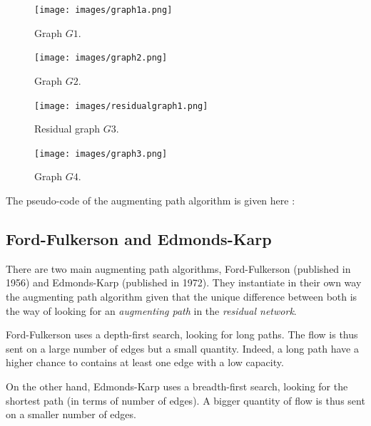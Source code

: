\begin{figure}[h!]
   \begin{minipage}[b]{0.40\linewidth}
      \centering \texttt{[image: images/graph1a.png]}
      \caption{Graph $G1$.}
   \end{minipage}\hfill
   \begin{minipage}[b]{0.48\linewidth}   
      \centering \texttt{[image: images/graph2.png]}
      \caption{Graph $G2$.}
   \end{minipage}\hfill
   \begin{minipage}[b]{0.48\linewidth}   
      \centering \texttt{[image: images/residualgraph1.png]}
      \caption{Residual graph $G3$.}
   \end{minipage}\hfill
   \begin{minipage}[b]{0.48\linewidth}  
      \centering \texttt{[image: images/graph3.png]}
      \caption{Graph $G4$.}
   \end{minipage}
\end{figure}

The pseudo-code of the augmenting path algorithm is given here :

\begin{algorithm}[h]

\end{algorithm}

\newpage
\subsection{Ford-Fulkerson and Edmonds-Karp}
There are two main augmenting path algorithms, Ford-Fulkerson (published in 1956) and Edmonds-Karp (published in 1972). They instantiate in their own way the augmenting path algorithm given that the unique difference between both is the way of looking for an \textit{augmenting path} in the \textit{residual network}. \newline

Ford-Fulkerson uses a depth-first search, looking for long paths. The flow is thus sent on a large number of edges but a small quantity. Indeed, a long path have a higher chance to contains at least one edge with a low capacity. \newline

On the other hand, Edmonds-Karp uses a breadth-first search, looking for the shortest path (in terms of number of edges). A bigger quantity of flow is thus sent on a smaller number of edges. \newline


